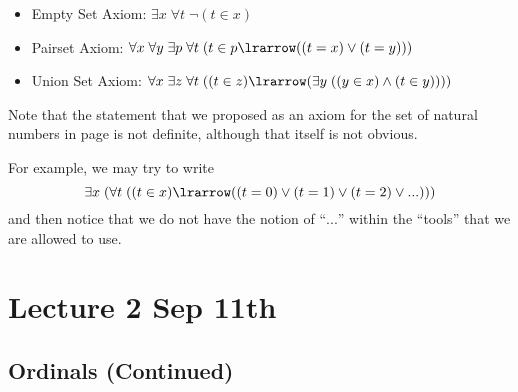 \documentclass[notoc,notitlepage]{tufte-book}
\begin{document}
\begin{itemize}
  \item Empty Set Axiom: $\exists x \; \forall t \; \neg ( t \in x )$
  \item Pairset Axiom: $\forall x \; \forall y \; \exists p \; \forall t \; ( t \in p \lrarrow ( ( t = x ) \lor ( t = y ) ) )$
    \item Union Set Axiom: $\forall x \; \exists z \; \forall t \; ( ( t \in z ) \lrarrow ( \exists y \; ( (y \in x) \land ( t \in y ) ) ) )$
\end{itemize}

Note that the statement that we proposed as an axiom for the set of natural numbers in page \pageref{sp:natural_numbers_axiom} is not definite, although that itself is not obvious.

For example, we may try to write
\begin{equation*}
  \exists x \; ( \forall t \; ( ( t \in x ) \lrarrow ( (t = 0) \lor (t = 1) \lor ( t = 2 ) \lor ... ) ) )
\end{equation*}
and then notice that we do not have the notion of ``$...$'' within the ``tools'' that we are allowed to use.




\chapter{Lecture 2 Sep 11th}%
\label{chp:lecture_2_sep_11th}

\section{Ordinals (Continued)}%
\label{sec:ordinals_continued}
\end{document}
